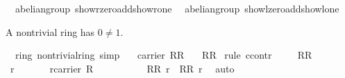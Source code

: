 \begin{isabellebody}
\endisatagproof
{\isafoldproof}%
%
\isadelimproof
\isanewline
%
\endisadelimproof
\isanewline
\isanewline
{}\isamarkupfalse%
\ {\isacharparenleft}\ abelian{\isacharunderscore}group{\isacharparenright}\ show{\isacharunderscore}r{\isacharunderscore}zero{\isacharequal}add{\isachardot}show{\isacharunderscore}r{\isacharunderscore}one\isanewline
{}\isamarkupfalse%
\ {\isacharparenleft}\ abelian{\isacharunderscore}group{\isacharparenright}\ show{\isacharunderscore}l{\isacharunderscore}zero{\isacharequal}add{\isachardot}show{\isacharunderscore}l{\isacharunderscore}one%
\begin{isamarkuptext}%
A nontrivial ring has $0\neq 1$.%
\end{isamarkuptext}%
\isamarkuptrue%
\isamarkupfalse%
\ {\isacharparenleft}\ ring{\isacharparenright}\ nontrivial{\isacharunderscore}ring\ {\isacharbrackleft}simp{\isacharbrackright}{\isacharcolon}\isanewline
\ \ \ {\isachardoublequoteopen}carrier\ R{\isasymnoteq}{\isacharbraceleft}{\isasymzero}\isactrlbsub R\isactrlesub {\isacharbraceright}{\isachardoublequoteclose}\isanewline
\ \ \ {\isachardoublequoteopen}{\isasymzero}\isactrlbsub R\isactrlesub {\isasymnoteq}{\isasymone}\isactrlbsub R\isactrlesub {\isachardoublequoteclose}\isanewline
%
\isadelimproof
%
\endisadelimproof
%
\isatagproof
{}\isamarkupfalse%
\ {\isacharparenleft}rule\ ccontr{\isacharparenright}\isanewline
\ \ \isamarkupfalse%
\ {}{\isacharcolon}\ {\isachardoublequoteopen}{\isasymnot}{\isacharparenleft}{\isasymzero}\isactrlbsub R\isactrlesub {\isasymnoteq}{\isasymone}\isactrlbsub R\isactrlesub {\isacharparenright}{\isachardoublequoteclose}\isanewline
\ \ \isacommand{{\isacharbraceleft}}\isamarkupfalse%
\isanewline
\ \ \ \ \isamarkupfalse%
\ r\isanewline
\ \ \ \ \isamarkupfalse%
\ {}{\isacharcolon}\ {\isachardoublequoteopen}r{\isasymin}carrier\ R{\isachardoublequoteclose}\isanewline
\ \ \ \ \isamarkupfalse%
\ {}\ {}\ \isamarkupfalse%
\ {}{\isacharcolon}\ {\isachardoublequoteopen}{\isasymone}\isactrlbsub R\isactrlesub {\isasymotimes}\isactrlbsub R\isactrlesub \ r\ {\isacharequal}\ {\isasymzero}\isactrlbsub R\isactrlesub {\isasymotimes}\isactrlbsub R\isactrlesub \ r{\isachardoublequoteclose}\ \isamarkupfalse%
\ auto\isanewline
\ \ \ \ \isamarkupfalse%
\ {}\ {}\ \isamarkupfalse%

\end{isabellebody}
